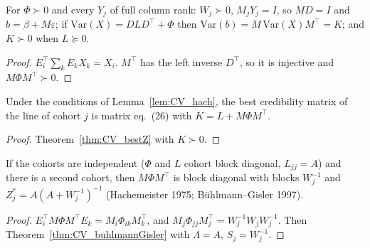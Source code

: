 \begin{lemma}\label{lem:CV_hach}
  \leanok
  For $\Phi \succ 0$ and every $Y_j$ of full column rank: $W_j \succ 0$, $M_jY_j = I$, so
  $MD = I$ and $b = \beta + M\varepsilon$; if $\mathrm{Var}(X) = DLD^\top + \Phi$ then
  $\mathrm{Var}(b) = M\,\mathrm{Var}(X)M^\top = K$; and $K \succ 0$ when $L \succeq 0$.
\end{lemma}
\begin{proof}
  \leanok
  $E_i^\top\sum_k E_kX_k = X_i$. $M^\top$ has the left inverse $D^\top$, so it is injective
  and $M\Phi M^\top \succ 0$.
\end{proof}

\begin{theorem}\label{thm:CV_hachemeister}
  \leanok
  Under the conditions of Lemma~\ref{lem:CV_hach}, the best credibility matrix of the line
  of cohort $j$ is matrix eq.\ (26) with $K = L + M\Phi M^\top$.
\end{theorem}
\begin{proof}
  \leanok
  Theorem~\ref{thm:CV_bestZ} with $K \succ 0$.
\end{proof}

\begin{theorem}\label{thm:CV_hachemeister_blockDiag}
  \leanok
  If the cohorts are independent ($\Phi$ and $L$ cohort block diagonal, $L_{jj} = A$) and
  there is a second cohort, then $M\Phi M^\top$ is block diagonal with blocks $W_j^{-1}$ and
  $Z_j^\ast = A(A + W_j^{-1})^{-1}$ (Hachemeister 1975; Bühlmann--Gisler 1997).
\end{theorem}
\begin{proof}
  \leanok
  $E_i^\top M\Phi M^\top E_k = M_i\Phi_{ik}M_k^\top$, and
  $M_j\Phi_{jj}M_j^\top = W_j^{-1}W_jW_j^{-1}$. Then
  Theorem~\ref{thm:CV_buhlmannGisler} with $\Lambda = A$, $S_j = W_j^{-1}$.
\end{proof}

